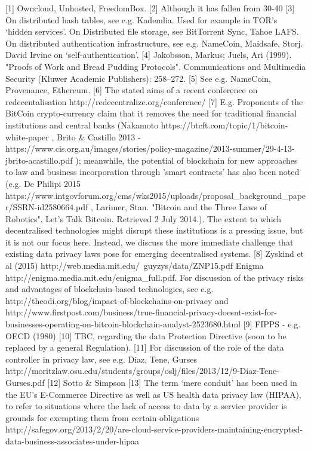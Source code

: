 \documentclass{acm_proc_article-sp}
\begin{document}
[1] Owncloud, Unhosted, FreedomBox.
[2] Although it has fallen from 30-40%
[3] On distributed hash tables, see e.g. Kademlia. Used for example in TOR’s ‘hidden services’. On Distributed file storage, see BitTorrent Sync, Tahoe LAFS. On distributed authentication infrastructure, see e.g. NameCoin, Maidsafe, Storj. David Irvine on ‘self-authentication’.
[4] Jakobsson, Markus; Juels, Ari (1999). "Proofs of Work and Bread Pudding Protocols". Communications and Multimedia Security (Kluwer Academic Publishers): 258–272.
[5] See e.g. NameCoin, Provenance, Ethereum.
[6] The stated aims of a recent conference on redecentalisation http://redecentralize.org/conference/
[7] E.g. Proponents of the BitCoin crypto-currency claim that it removes the need for traditional financial institutions and central banks (Nakamoto https://btcft.com/topic/1/bitcoin-white-paper , Brito & Castillo 2013 - https://www.cis.org.au/images/stories/policy-magazine/2013-summer/29-4-13-jbrito-acastillo.pdf ); meanwhile, the potential of blockchain for new approaches to law and business incorporation through 'smart contracts' has also been noted (e.g. De Philipi 2015 https://www.intgovforum.org/cms/wks2015/uploads/proposal_background_paper/SSRN-id2580664.pdf , Larimer, Stan. "Bitcoin and the Three Laws of Robotics". Let's Talk Bitcoin. Retrieved 2 July 2014.). The extent to which decentralised technologies might disrupt these institutions is a pressing issue, but it is not our focus here. Instead, we discuss the more immediate challenge that existing data privacy laws pose for emerging decentralised systems.
[8] Zyskind et al (2015) http://web.media.mit.edu/~guyzys/data/ZNP15.pdf
Enigma http://enigma.media.mit.edu/enigma_full.pdf. For discussion of the privacy risks and advantages of blockchain-based technologies, see e.g. http://theodi.org/blog/impact-of-blockchains-on-privacy and http://www.firstpost.com/business/true-financial-privacy-doesnt-exist-for-businesses-operating-on-bitcoin-blockchain-analyst-2523680.html
[9] FIPPS - e.g. OECD (1980)
[10] TBC, regarding the data Protection Directive (soon to be replaced by a general Regulation).
[11] For discussion of the role of the data controller in privacy law, see e.g. Diaz, Tene, Gurses http://moritzlaw.osu.edu/students/groups/oslj/files/2013/12/9-Diaz-Tene-Gurses.pdf
[12] Sotto & Simpson
[13]  The term ‘mere conduit’ has been used in the EU’s E-Commerce Directive as well as US health data privacy law (HIPAA), to refer to situations where the lack of access to data by a service provider is grounds for exempting them from certain obligations http://safegov.org/2013/2/20/are-cloud-service-providers-maintaining-encrypted-data-business-associates-under-hipaa
\end{document}
